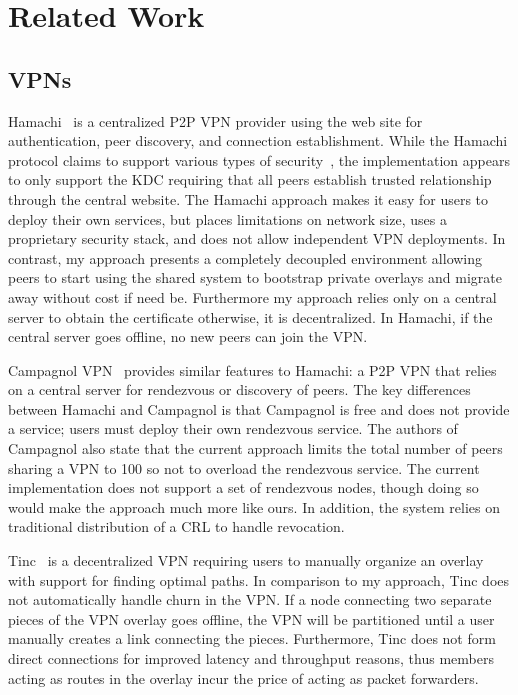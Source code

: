 \section{Related Work}
\label{vpn:related_work}

\subsection{VPNs}

Hamachi~\cite{hamachi} is a centralized P2P VPN provider using the web site for
authentication, peer discovery, and connection establishment.  While the
Hamachi protocol claims to support various types of
security~\cite{hamachi_security}, the implementation appears to only support
the KDC requiring that all peers establish trusted relationship through the
central website.  The Hamachi approach makes it easy for users to deploy their
own services, but places limitations on network size, uses a proprietary
security stack, and does not allow independent VPN deployments.  In contrast,
my approach presents a completely decoupled environment allowing peers to start
using the shared system to bootstrap private overlays and migrate away without
cost if need be.  Furthermore my approach relies only on a central server to
obtain the certificate otherwise, it is decentralized.  In Hamachi, if the
central server goes offline, no new peers can join the VPN.

Campagnol VPN~\cite{campagnol} provides similar features to Hamachi: a P2P VPN
that relies on a central server for rendezvous or discovery of peers.  The key
differences between Hamachi and Campagnol is that Campagnol is free and does
not provide a service; users must deploy their own rendezvous service.  The
authors of Campagnol also state that the current approach limits the total
number of peers sharing a VPN to 100 so not to overload the rendezvous service.
The current implementation does not support a set of rendezvous nodes, though
doing so would make the approach much more like ours.  In addition, the system
relies on traditional distribution of a CRL to handle revocation.

Tinc~\cite{tinc} is a decentralized VPN requiring users to manually organize an
overlay with support for finding optimal paths.  In comparison to my approach,
Tinc does not automatically handle churn in the VPN.  If a node connecting two
separate pieces of the VPN overlay goes offline, the VPN will be partitioned
until a user manually creates a link connecting the pieces.  Furthermore, Tinc
does not form direct connections for improved latency and throughput reasons,
thus members acting as routes in the overlay incur the price of acting as
packet forwarders.

